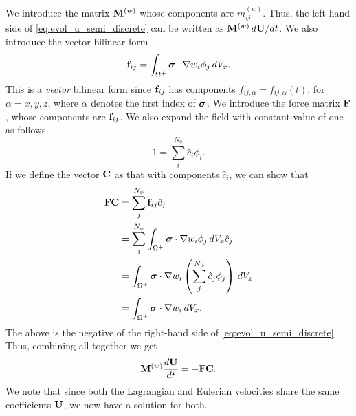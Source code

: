 \documentclass[11pt]{report}
\begin{document}
We introduce the matrix $\mathbf{M}^{(w)}$ whose components are $m_{ij}^{(w)}$. Thus, the left-hand side of \cref{eq:evol_u_semi_discrete} can be written as $\mathbf{M}^{(w)} \, d\mathbf{U} / dt$.
We also introduce the vector bilinear form
\begin{equation}
    \mathbf{f}_{ij} = \int_{\Omega^+} \bm \sigma \cdot \nabla w_i \phi_j \, dV_x.
\end{equation}
This is a \textit{vector} bilinear form since $\mathbf{f}_{ij}$ has components $f_{ij,\alpha} = f_{ij,\alpha}(t)$, for $\alpha = x,y,z$, where $\alpha$ denotes the first index of $\bm \sigma$. We introduce the force matrix $\mathbf{F}$, whose components are $\mathbf{f}_{ij}$. We also expand the field with constant value of one as follows
\begin{equation}
    1 = \sum_i^{N_\phi} \hat{c}_i \phi_i.
\end{equation}
If we define the vector $\mathbf{C}$ as that with components $\hat{c}_i$, we can show that 
\begin{align}
    \mathbf{F} \mathbf{C} &= \sum_j^{N_\phi} \mathbf{f}_{ij} \hat{c}_j \nonumber \\
    &= \sum_j^{N_\phi} \int_{\Omega^+} \bm \sigma \cdot \nabla w_i \phi_j \, dV_x \hat{c}_j \nonumber \\
    &= \int_{\Omega^+} \bm \sigma \cdot \nabla w_i \left ( \sum_j^{N_\phi} \hat{c}_j \phi_j \right ) \, dV_x \nonumber \\
    &= \int_{\Omega^+} \bm \sigma \cdot \nabla w_i \, dV_x.
\end{align}
The above is the negative of the right-hand side of \cref{eq:evol_u_semi_discrete}. Thus, combining all together we get
\begin{equation}
    \mathbf{M}^{(w)} \frac{d\mathbf{U}}{dt} = -\mathbf{F} \mathbf{C}.
\end{equation}
We note that since both the Lagrangian and Eulerian velocities share the same coefficients $\mathbf{U}$, we now have a solution for both.

\end{document}
